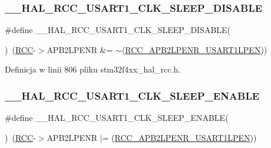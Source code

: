 \subsubsection{\texorpdfstring{\+\_\+\+\_\+\+H\+A\+L\+\_\+\+R\+C\+C\+\_\+\+U\+S\+A\+R\+T1\+\_\+\+C\+L\+K\+\_\+\+S\+L\+E\+E\+P\+\_\+\+D\+I\+S\+A\+B\+LE}{\_\_HAL\_RCC\_USART1\_CLK\_SLEEP\_DISABLE}}
{\footnotesize\ttfamily \#define \+\_\+\+\_\+\+H\+A\+L\+\_\+\+R\+C\+C\+\_\+\+U\+S\+A\+R\+T1\+\_\+\+C\+L\+K\+\_\+\+S\+L\+E\+E\+P\+\_\+\+D\+I\+S\+A\+B\+LE(\begin{DoxyParamCaption}{ }\end{DoxyParamCaption})~(\hyperlink{group___peripheral__declaration_ga74944438a086975793d26ae48d5882d4}{R\+CC}-\/$>$A\+P\+B2\+L\+P\+E\+NR \&= $\sim$(\hyperlink{group___peripheral___registers___bits___definition_gab8b429bc8d52abd1ba3818a82542bb98}{R\+C\+C\+\_\+\+A\+P\+B2\+L\+P\+E\+N\+R\+\_\+\+U\+S\+A\+R\+T1\+L\+P\+EN}))}



Definicja w linii 806 pliku stm32f4xx\+\_\+hal\+\_\+rcc.\+h.

\mbox{\label{group___r_c_c___a_p_b2___low_power___enable___disable_ga454514918be60a95069da332eb212712}} 
\subsubsection{\texorpdfstring{\+\_\+\+\_\+\+H\+A\+L\+\_\+\+R\+C\+C\+\_\+\+U\+S\+A\+R\+T1\+\_\+\+C\+L\+K\+\_\+\+S\+L\+E\+E\+P\+\_\+\+E\+N\+A\+B\+LE}{\_\_HAL\_RCC\_USART1\_CLK\_SLEEP\_ENABLE}}
{\footnotesize\ttfamily \#define \+\_\+\+\_\+\+H\+A\+L\+\_\+\+R\+C\+C\+\_\+\+U\+S\+A\+R\+T1\+\_\+\+C\+L\+K\+\_\+\+S\+L\+E\+E\+P\+\_\+\+E\+N\+A\+B\+LE(\begin{DoxyParamCaption}{ }\end{DoxyParamCaption})~(\hyperlink{group___peripheral__declaration_ga74944438a086975793d26ae48d5882d4}{R\+CC}-\/$>$A\+P\+B2\+L\+P\+E\+NR $\vert$= (\hyperlink{group___peripheral___registers___bits___definition_gab8b429bc8d52abd1ba3818a82542bb98}{R\+C\+C\+\_\+\+A\+P\+B2\+L\+P\+E\+N\+R\+\_\+\+U\+S\+A\+R\+T1\+L\+P\+EN}))}



